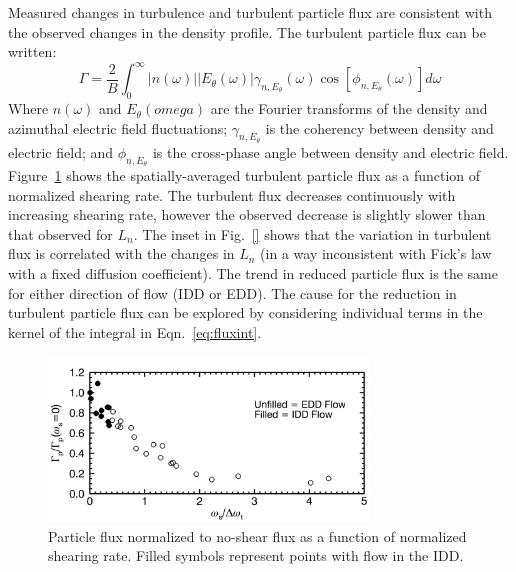 \documentclass[aps,prl,amsmath,amssymb,preprint,superscriptaddress]{revtex4}
\begin{document}
Measured changes in turbulence and turbulent particle flux are
consistent with the observed changes in the density profile.  The
turbulent particle flux can be written\cite{powers74}:
\begin{equation}
\Gamma = \frac{2}{B} \int^{\infty}_{0} \lvert n(\omega) \rvert \lvert E_{\theta}(\omega) \rvert \gamma_{n,E_{\theta}}(\omega) \cos [\phi_{n,E_{\theta}}(\omega)] d\omega
\label{eq:fluxint}
\end{equation}
Where $n(\omega)$ and $E_\theta(omega)$ are the Fourier transforms of
the density and azimuthal electric field fluctuations;
$\gamma_{n,E_\theta}$ is the coherency between density and electric
field; and $\phi_{n,E_\theta}$ is the cross-phase angle between
density and electric field.
Figure~\ref{fig:fluxvsshear} shows the spatially-averaged turbulent
particle flux as a function of normalized shearing rate.  The
turbulent flux decreases continuously with increasing shearing rate,
however the observed decrease is slightly slower than that observed
for $L_n$.  The inset in Fig.~\ref{} shows that the variation in
turbulent flux is correlated with the changes in $L_n$ (in a way
inconsistent with Fick's law with a fixed diffusion coefficient).  The
trend in reduced particle flux is the same for either direction of
flow (IDD or EDD).  The cause for the reduction in turbulent particle
flux can be explored by considering individual terms in the kernel of
the integral in Eqn.~\ref{eq:fluxint}.


\begin{figure}[!htbp]
\centerline{
\includegraphics[width=8.5cm]{fluxvsshear.pdf}}
\caption{\label{fig:fluxvsshear} Particle flux normalized to no-shear
  flux as a function of normalized shearing rate. Filled symbols
  represent points with flow in the IDD.}
\end{figure}
\end{document}
